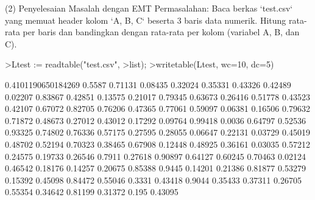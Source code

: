 \documentclass{article}
\newenvironment{eulernotebook}{\par}{\par}
\newenvironment{eulercomment}{\par\medskip}{\par\medskip}
\begin{document}
\begin{eulernotebook}
\begin{eulercomment}
\begin{eulercomment}
\begin{eulercomment}
\begin{eulercomment}
\begin{eulercomment}
\begin{eulercomment}
\begin{eulercomment}
(2) Penyelesaian Masalah dengan EMT
Permasalahan: Baca berkas `test.csv` yang memuat header kolom `A, B, C` beserta 3 baris data numerik. Hitung rata-rata per baris dan bandingkan dengan rata-rata per kolom (variabel A, B, dan C).
\end{eulercomment}
\begin{eulerprompt}
>Ltest := readtable("test.csv", >list);
>writetable(Ltest, wc=10, dc=5)
\end{eulerprompt}
\begin{euleroutput}
   0.4101190650184269
               0.5587
              0.71131
              0.08435
              0.32024
              0.35331
              0.43326
              0.42489
              0.02207
              0.83867
              0.42851
              0.13575
              0.21017
              0.79345
              0.63673
              0.26416
              0.51778
              0.43523
              0.42107
              0.67072
              0.82705
              0.76206
              0.47365
              0.77061
              0.59097
              0.06381
              0.16506
              0.79632
              0.71872
              0.48673
              0.27012
              0.43012
              0.17292
              0.09764
              0.99418
               0.0036
              0.64797
              0.52536
              0.93325
              0.74802
              0.76336
              0.57175
              0.27595
              0.28055
              0.06647
              0.22131
              0.03729
              0.45019
              0.48702
              0.52194
              0.70323
              0.38465
              0.67908
              0.12448
              0.48925
              0.36161
              0.03035
              0.57212
              0.24575
              0.19733
              0.26546
               0.7911
              0.27618
              0.90897
              0.64127
              0.60245
              0.70463
              0.02124
              0.46542
              0.18176
              0.14257
              0.20675
              0.85388
               0.9445
              0.14201
              0.21386
              0.81877
              0.53279
              0.15392
              0.45098
              0.84472
              0.55046
               0.3331
              0.43418
               0.9044
              0.35433
              0.37311
              0.26705
              0.55354
              0.34642
              0.81199
              0.31372
                0.195
              0.43095

\end{euleroutput}
\end{eulercomment}
\end{eulercomment}
\end{eulercomment}
\end{eulercomment}
\end{eulercomment}
\end{eulercomment}
\end{eulernotebook}
\end{document}
